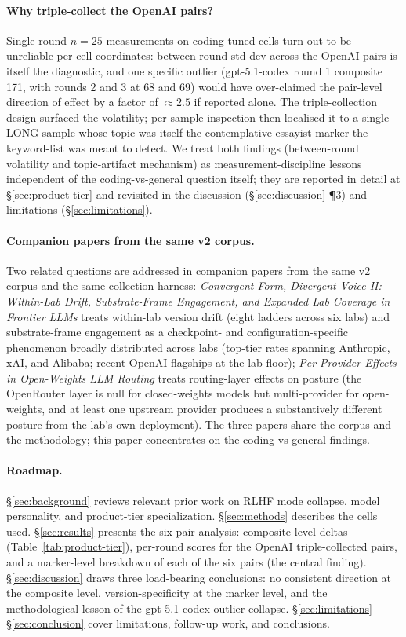 \documentclass[11pt,a4paper]{article}
\begin{document}
\paragraph{Why triple-collect the OpenAI pairs?} Single-round $n{=}25$ measurements on coding-tuned cells turn out to be unreliable per-cell coordinates: between-round std-dev across the OpenAI pairs is itself the diagnostic, and one specific outlier (gpt-5.1-codex round 1 composite 171, with rounds 2 and 3 at 68 and 69) would have over-claimed the pair-level direction of effect by a factor of $\approx 2.5$ if reported alone. The triple-collection design surfaced the volatility; per-sample inspection then localised it to a single LONG sample whose topic was itself the contemplative-essayist marker the keyword-list was meant to detect. We treat both findings (between-round volatility and topic-artifact mechanism) as measurement-discipline lessons independent of the coding-vs-general question itself; they are reported in detail at \S\ref{sec:product-tier} and revisited in the discussion (\S\ref{sec:discussion} \P3) and limitations (\S\ref{sec:limitations}).

\paragraph{Companion papers from the same v2 corpus.} Two related questions are addressed in companion papers from the same v2 corpus and the same collection harness: \emph{Convergent Form, Divergent Voice II: Within-Lab Drift, Substrate-Frame Engagement, and Expanded Lab Coverage in Frontier LLMs} \citep{tenner2026drift} treats within-lab version drift (eight ladders across six labs) and substrate-frame engagement as a checkpoint- and configuration-specific phenomenon broadly distributed across labs (top-tier rates spanning Anthropic, xAI, and Alibaba; recent OpenAI flagships at the lab floor); \emph{Per-Provider Effects in Open-Weights LLM Routing} \citep{tenner2026routing} treats routing-layer effects on posture (the OpenRouter layer is null for closed-weights models but multi-provider for open-weights, and at least one upstream provider produces a substantively different posture from the lab's own deployment). The three papers share the corpus and the methodology; this paper concentrates on the coding-vs-general findings.

\paragraph{Roadmap.} \S\ref{sec:background} reviews relevant prior work on RLHF mode collapse, model personality, and product-tier specialization. \S\ref{sec:methods} describes the cells used. \S\ref{sec:results} presents the six-pair analysis: composite-level deltas (Table~\ref{tab:product-tier}), per-round scores for the OpenAI triple-collected pairs, and a marker-level breakdown of each of the six pairs (the central finding). \S\ref{sec:discussion} draws three load-bearing conclusions: no consistent direction at the composite level, version-specificity at the marker level, and the methodological lesson of the gpt-5.1-codex outlier-collapse. \S\ref{sec:limitations}--\S\ref{sec:conclusion} cover limitations, follow-up work, and conclusions.
\end{document}
